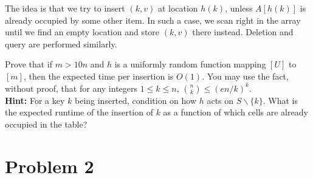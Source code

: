 \documentclass[12pt]{article}
\begin{document}
\begin{center}
\end{center}

The idea is that we try to insert $(k,v)$ at location $h(k)$, unless $A[h(k)]$ is already occupied by some other item. In such a case, we scan right in the array until we find an empty location and store $(k,v)$ there instead. Deletion and query are performed similarly.

Prove that if $m > 10n$ and $h$ is a uniformly random function mapping $[U]$ to $[m]$, then the expected time per insertion is $O(1)$. You may use the fact, without proof, that for any integers $1\le k\le n$, $\binom{n}{k} \le (en/k)^k$.\\
\textbf{Hint:} For a key $k$ being inserted, condition on how $h$ acts on $S\backslash \{k\}$. What is the expected runtime of the insertion of $k$ as a function of which cells are already occupied in the table?

\section*{Problem 2}
\end{document}
